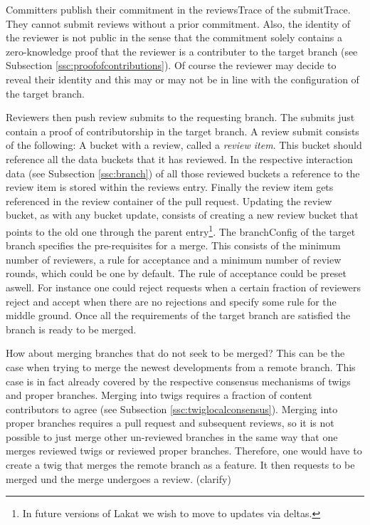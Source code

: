 \documentclass[14pt]{article}
\newcommand{\remark}[1]{{\color{purple} (#1)}}
\begin{document}
Committers publish their commitment in the reviewsTrace of the submitTrace. They cannot submit reviews without a prior commitment. Also, the identity of the reviewer is not public in the sense that the commitment solely contains a zero-knowledge proof that the reviewer is a contributer to the target branch (see Subsection \ref{ssc:proofofcontributions}).
Of course the reviewer may decide to reveal their identity and this may or may not be in line with the configuration of the target branch.

Reviewers then push review submits to the requesting branch. The submits just contain a proof of contributorship in the target branch. A review submit consists of the following: A bucket with a review, called a \textit{review item}. This bucket should reference all the data buckets that it has reviewed. In the respective interaction data (see Subsection \ref{ssc:branch}) of all those reviewed buckets a reference to the review item is stored within the reviews entry. Finally the review item gets referenced in the review container of the pull request. Updating the review bucket, as with any bucket update, consists of creating a new review bucket that points to the old one through the parent entry\footnote{In future versions of Lakat we wish to move to updates via deltas.}. The branchConfig of the target branch specifies the pre-requisites for a merge. This consists of the minimum number of reviewers, a rule for acceptance and a minimum number of review rounds, which could be one by default. The rule of acceptance could be preset aswell. For instance one could reject requests when a certain fraction of reviewers reject and accept when there are no rejections and specify some rule for the middle ground. Once all the requirements of the target branch are satisfied the branch is ready to be merged. 

How about merging branches that do not seek to be merged? This can be the case when trying to merge the newest developments from a remote branch. This case is in fact already covered by the respective consensus mechanisms of twigs and proper branches. Merging into twigs requires a fraction of content contributors to agree (see Subsection \ref{ssc:twiglocalconsensus}). Merging into proper branches requires a pull request and subsequent reviews, so it is not possible to just merge other un-reviewed branches in the same way that one merges reviewed twigs or reviewed proper branches. Therefore, one would have to create a twig that merges the remote branch as a feature. It then requests to be merged und the merge undergoes a review. \remark{clarify}
\end{document}
